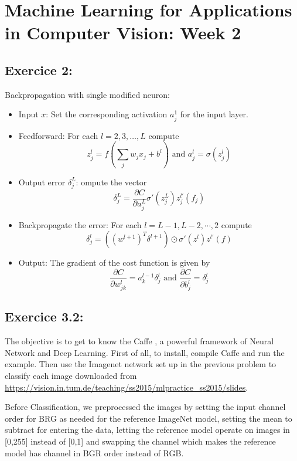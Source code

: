 \documentclass[12pt,a4paper,twoside]{article}
\begin{document}
\section*{Machine Learning for Applications \\
in Computer Vision: Week 2}
\hrulefill

\subsection*{Exercice 2:}
Backpropagation with single modified neuron:
\begin{itemize}
\item Input $x$: Set the corresponding activation $a_{j}^{1}$ for the input layer.
\item Feedforward: For each $l = 2,3,\ldots,L$ compute
\[z_{j}^{l} = f\left(\sum_{j} w_{j} x_{j}+b^{l}\right) \text{ and } a_{j}^{l} = \sigma(z_{j}^{l})\]
\item Output error $\delta_{j}^{L}$: ompute the vector
\[ \delta_{j}^{L} = \frac{\partial C}{\partial a_{j}^{L}} \sigma'(z_{j}^{L}) z_{j}^{l'} (f_{j})
\]
\item Backpropagate the error: For each $l = L-1, L-2, \cdots , 2$ compute
  \[ \delta_{j}^{l} = ((w^{l+1})^{T}\delta^{l+1}) \odot \sigma'(z^{l})z^{l'}(f)\]
\item Output: The gradient of the cost function is given by
\[\frac{\partial C}{\partial w_{jk}^{l}} = a_{k}^{l-1}\delta_{j}^{l} \text{ and }\frac{\partial C}{\partial b_{j}^{l}}= \delta_{j}^{l}\]
\end{itemize}

\subsection*{Exercice 3.2:}
The objective is to get to know the Caffe , a powerful framework of Neural Network and Deep Learning. First of all, to install, compile Caffe and run the example. Then use the Imagenet network  set up in the previous problem to classify each image downloaded from \url{https://vision.in.tum.de/teaching/ss2015/mlpractice_ss2015/slides}.

Before Classification, we preprocessed the images by setting the input channel order for BRG as needed for the reference ImageNet model, setting the mean to subtract for entering the data, letting the reference model operate on images in [0,255] instead of [0,1] and swapping the channel which makes the reference model has channel in BGR order instead of RGB.  
\end{document}
